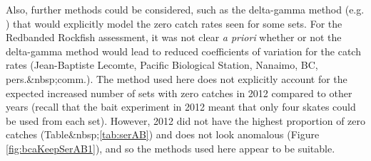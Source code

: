 Also, further methods could be considered, such as the delta-gamma method
(e.g. \citealt{lbaebp13}) that would explicitly model the zero catch rates seen
for some sets. For the Redbanded Rockfish assessment, it was not clear \emph{a
  priori} whether or not the delta-gamma method would lead to reduced
coefficients of variation for the catch rates (Jean-Baptiste Lecomte, Pacific
Biological Station, Nanaimo, BC, pers.&nbsp;comm.). The method used here does not
explicitly account for the expected increased number of sets with zero catches
in 2012 compared to other years (recall that the bait experiment in 2012 meant
that only four skates could be used from each set). However, 2012 did not have
the highest proportion of zero catches (Table&nbsp;\ref{tab:serAB}) and does not look
anomalous (Figure \ref{fig:bcaKeepSerAB1}), and so the methods used here appear
to be suitable.


\clearpage
